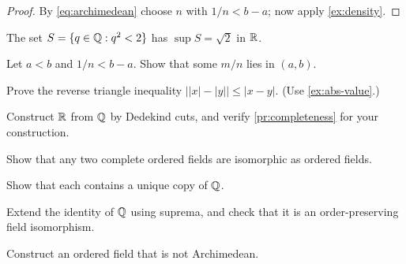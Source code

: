 \begin{proof}
By \eqref{eq:archimedean} choose $n$ with $1/n<b-a$; now apply
\cref{ex:density}.
\end{proof}

\begin{example}
The set $S=\{q\in\mathbb{Q}: q^2<2\}$ has $\sup S=\sqrt2$ in $\R$.
\end{example}

\begin{exercises}
\begin{exercise}\label{ex:density}
Let $a<b$ and $1/n<b-a$. Show that some $m/n$ lies in $(a,b)$.
\end{exercise}

\begin{exercise}\label{ex:reverse-triangle}
Prove the reverse triangle inequality $\bigl||x|-|y|\bigr|\le|x-y|$.
(Use \cref{ex:abs-value}.)
\end{exercise}

\begin{exercise*}\label{ex:cuts}
Construct $\R$ from $\mathbb{Q}$ by Dedekind cuts, and verify
\cref{pr:completeness} for your construction.
\end{exercise*}
\end{exercises}

\begin{problems}
\begin{problem}[Uniqueness of $\R$]\label{prob:unique}
Show that any two complete ordered fields are isomorphic as ordered fields.
\begin{parts}
  \item Show that each contains a unique copy of $\mathbb{Q}$.
  \item Extend the identity of $\mathbb{Q}$ using suprema, and check that it is an
        order-preserving field isomorphism.
\end{parts}
\end{problem}

\begin{problem*}\label{prob:non-arch}
Construct an ordered field that is not Archimedean.
\end{problem*}
\end{problems}

